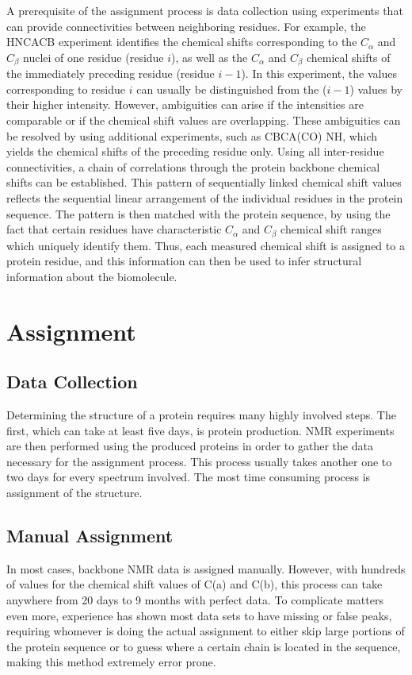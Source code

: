 \documentclass[12pt, letter]{article}
\begin{document}
A prerequisite of the assignment process is data collection using experiments that can provide connectivities between neighboring residues. For example, the HNCACB experiment identifies the chemical shifts corresponding to the $C_\alpha$ and $C_{\beta}$ nuclei of one residue (residue $i$), as well as the $C_\alpha$ and $C_{\beta}$ chemical shifts of the immediately preceding residue (residue $i -1$). In this experiment, the values corresponding to residue $i$ can usually be distinguished from the ($i -1$) values by their higher intensity. However, ambiguities can arise if the intensities are comparable or if the chemical shift values are overlapping. These ambiguities can be resolved by using additional experiments, such as CBCA(CO) NH, which yields the chemical shifts of the preceding residue only. Using all inter-residue connectivities, a chain of correlations through the protein backbone chemical shifts can be established.  This pattern of sequentially linked chemical shift values reflects the sequential linear arrangement of the individual residues in the protein sequence. The pattern is then matched with the protein sequence, by using the fact that certain residues have characteristic $C_\alpha$ and $C_{\beta}$ chemical shift ranges which uniquely identify them. Thus, each measured chemical shift is assigned to a protein residue, and this information can then be used to infer structural information about the biomolecule.

\section{Assignment} %
\label{sec:method}

\subsection{Data Collection} %
\label{sub:data_collection}
Determining the structure of a protein requires many highly involved steps. The first, which can take at least five days, is protein production. NMR experiments are then performed using the produced proteins in order to gather the data necessary for the assignment process. This process usually takes another one to two days for every spectrum involved. The most time consuming process is assignment of the structure. \cite{babak_alipanahi_error_2011}

\subsection{Manual Assignment} %
\label{sub:manual_assignment}
In most cases, backbone NMR data is assigned manually. However, with hundreds of values for the chemical shift values of C(a) and C(b), this process can take anywhere from 20 days to 9 months with perfect data. To complicate matters even more, experience has shown most data sets to have missing or false peaks, requiring whomever is doing the actual assignment to either skip large portions of the protein sequence or to guess where a certain chain is located in the sequence, making this method extremely error prone. \cite{babak_alipanahi_error_2011}
\end{document}
